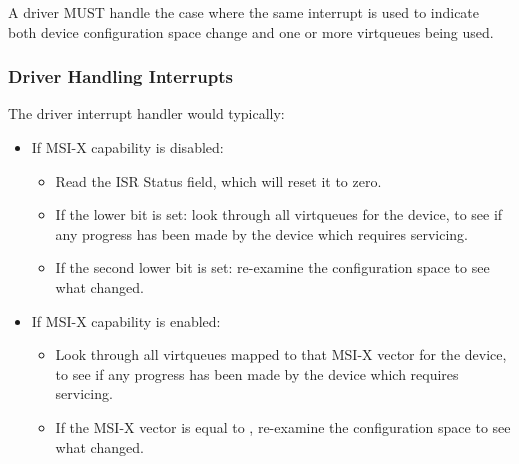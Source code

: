 A driver MUST handle the case where the same interrupt is used to indicate
both device configuration space change and one or more virtqueues being used.

\subsubsection{Driver Handling Interrupts}\label{sec:Virtio Transport Options / Virtio Over PCI Bus / PCI-specific Initialization And Device Operation / Driver Handling Interrupts}
The driver interrupt handler would typically:

\begin{itemize}
  \item If MSI-X capability is disabled:
    \begin{itemize}
      \item Read the ISR Status field, which will reset it to zero.
      \item If the lower bit is set:
        look through all virtqueues for the
        device, to see if any progress has been made by the device
        which requires servicing.
      \item If the second lower bit is set:
        re-examine the configuration space to see what changed.
    \end{itemize}
  \item If MSI-X capability is enabled:
    \begin{itemize}
      \item
        Look through all virtqueues mapped to that MSI-X vector for the
        device, to see if any progress has been made by the device
        which requires servicing.
      \item
        If the MSI-X vector is equal to ,
        re-examine the configuration space to see what changed.
    \end{itemize}
\end{itemize}
